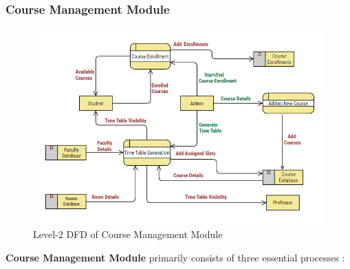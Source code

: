 \documentclass[12pt,a4paper]{article}
\begin{document}
\subsubsection{Course Management Module}
\begin{figure}[hbt!]
    \centering
        \includegraphics[width=\linewidth]{Course_Management_DFD.png} 
    \caption{Level-2 DFD of Course Management Module}
\end{figure}
\textbf{Course Management Module} primarily consists of three essential processes :
\end{document}
